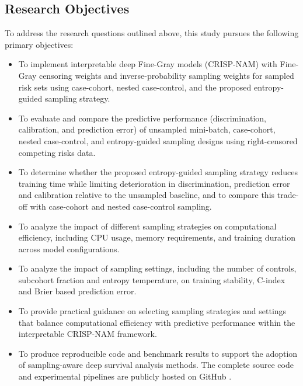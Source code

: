 \documentclass[a4paper,twoside,12pt]{report}
\begin{document}
\subsection{Research Objectives}
To address the research questions outlined above, this study pursues the following primary objectives:
\begin{itemize}
    \item To implement interpretable deep Fine-Gray models (CRISP-NAM) with Fine-Gray censoring weights and inverse-probability sampling weights for sampled risk sets using case-cohort, nested case-control, and the proposed entropy-guided sampling strategy.
    \item To evaluate and compare the predictive performance (discrimination, calibration, and prediction error) of unsampled mini-batch, case-cohort, nested case-control, and entropy-guided sampling designs using right-censored competing risks data.
    \item To determine whether the proposed entropy-guided sampling strategy reduces training time while limiting deterioration in discrimination, prediction error and calibration relative to the unsampled baseline, and to compare this trade-off with case-cohort and nested case-control sampling.
    \item To analyze the impact of different sampling strategies on computational efficiency, including CPU usage, memory requirements, and training duration across model configurations.
    \item To analyze the impact of sampling settings, including the number of controls, subcohort fraction and entropy temperature, on training stability, C-index and Brier based prediction error.
    \item To provide practical guidance on selecting sampling strategies and settings that balance computational efficiency with predictive performance within the interpretable CRISP-NAM framework.
    \item To produce reproducible code and benchmark results to support the adoption of sampling-aware deep survival analysis methods. The complete source code and experimental pipelines are publicly hosted on GitHub \citep{falk2026crispnam}.
\end{itemize}
\end{document}
